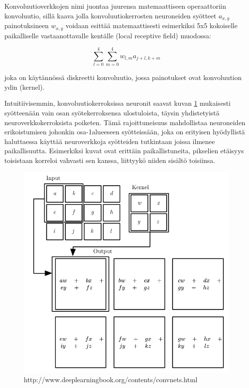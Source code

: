 \documentclass[finnish]{tktltiki2}
\theoremstyle{definition}
\theoremstyle{remark}
\begin{document}
  Konvoluutioverkkojen nimi juontaa juurensa matemaattiseen operaattoriin konvoluutio, sillä kaava jolla konvoluutiokerrosten neuroneiden syötteet $a_{x,y}$ painotuksineen $w_{x,y}$ voidaan esittää matemaattisesti esimerkiksi 5x5 kokoiselle paikalliselle vastaanottavalle kentälle (local receptive field) muodossa:

  $$ \sum_{l=0}^{4}\sum_{m=0}^{4} w_{l,m}a_{j+l,k+m}$$
  
    joka on käytännössä diskreetti konvoluutio, jossa painotukset ovat konvoluution ydin (kernel).

  Intuitiivisemmin, konvoluutiokerroksissa neuronit saavat kuvan \ref{pic:convolution} mukaisesti syötteenään vain osan syötekerroksensa ulostuloista, täysin yhdistetyistä neuroverkkokerroksista poiketen. Tämä rajoittuneisuus mahdollistaa neuroneiden erikoistumisen johonkin osa-1alueeseen syötteissään, joka on erityisen hyödyllistä haluttaessa käyttää neuroverkkoja syötteiden tutkintaan joissa ilmenee paikallisuutta. Esimerkiksi kuvat ovat erittäin paikallistuneita, pikselien etäisyys toisistaan korreloi vahvasti sen kanssa, liittyykö niiden sisältö toisiinsa.
  
  \begin{figure}[h]
  \label{pic:convolution}
  \centering
  \includegraphics[scale=0.4]{convolution}
  \caption{http://www.deeplearningbook.org/contents/convnets.html}
  \end{figure}
\end{document}
